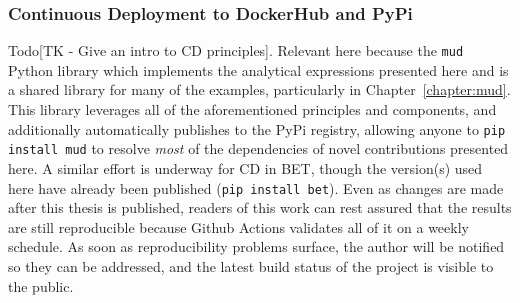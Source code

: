 \subsubsection{Continuous Deployment to DockerHub and PyPi}
Todo[TK - Give an intro to CD principles]. Relevant here because the {\tt mud} Python library which implements the analytical expressions presented here and is a shared library for many of the examples, particularly in Chapter~\ref{chapter:mud}.
This library leverages all of the aforementioned principles and components, and additionally automatically publishes to the PyPi registry, allowing anyone to {\tt pip install mud} to resolve \emph{most} of the dependencies of novel contributions presented here.
A similar effort is underway for CD in BET, though the version(s) used here have already been published ({\tt pip install bet}).
Even as changes are made after this thesis is published, readers of this work can rest assured that the results are still reproducible because Github Actions validates all of it on a weekly schedule.
As soon as reproducibility problems surface, the author will be notified so they can be addressed, and the latest build status of the project is visible to the public.
